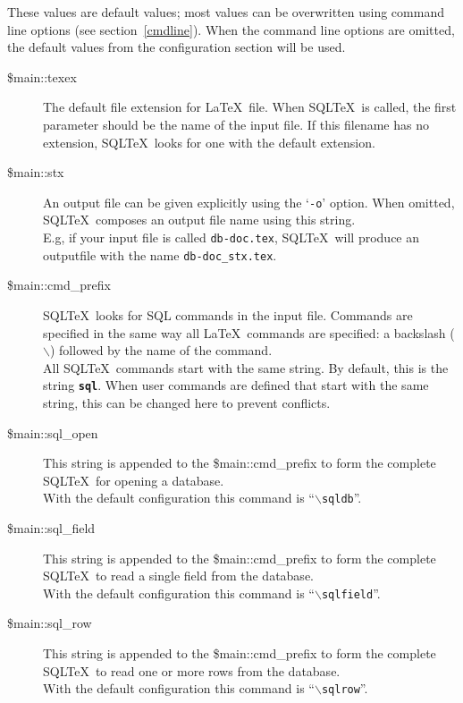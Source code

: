 \documentclass{article}
\newcommand{\bs}{\begin{math}\backslash\end{math}}
\newcommand{\vs}{\vspace{3mm}}
\begin{document}
\vs

These values are default values; most values can be overwritten using command line
options (see section~\ref{cmdline}). When the command line options are
omitted, the default values from the configuration section will be used.

\begin{description}

\item[\$main::texex] The default file extension for \LaTeX\ file. When SQL\TeX\ is called, the first
parameter should be the name of the input file. If this filename has no extension,
SQL\TeX\ looks for one with the default extension.

\item[\$main::stx] An output file can be given explicitly using the `\texttt{-o}' option. When omitted,
SQL\TeX\ composes an output file name using this string.\\
E.g, if your input file is called \texttt{db-doc.tex}, SQL\TeX\ will produce an
outputfile with the name \texttt{db-doc\_stx.tex}.

\item[\$main::cmd\_prefix]\label{prefix} SQL\TeX\ looks for SQL commands in the input file. Commands are specified in the
same way all \LaTeX\ commands are specified: a backslash (\bs) followed by the
name of the command.\\
All SQL\TeX\ commands start with the same string. By default, this is the string
\texttt{\textbf{sql}}. When user commands are defined that start with the same
string, this can be changed here to prevent conflicts.

\item[\$main::sql\_open] This string is appended to the \$main::cmd\_prefix to form the complete SQL\TeX\
for opening a database.\\
With the default configuration this command is ``\texttt{\bs sqldb}''.

\item[\$main::sql\_field] This string is appended to the \$main::cmd\_prefix to form the complete SQL\TeX\
to read a single field from the database.\\
With the default configuration this command is ``\texttt{\bs sqlfield}''.

\item[\$main::sql\_row] This string is appended to the \$main::cmd\_prefix to form the complete SQL\TeX\
to read one or more rows from the database.\\
With the default configuration this command is ``\texttt{\bs sqlrow}''.


\end{description}
\end{document}
